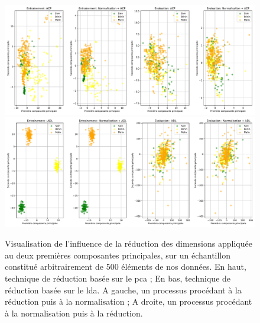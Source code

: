 \addtocounter{footnote}{1}
 
\begin{figure}[H]
    \centering
    \includegraphics[width=\linewidth]{contents/chapter_4/resources/visualisation_scaling_PCA.pdf}
    \includegraphics[width=\linewidth]{contents/chapter_4/resources/visualisation_scaling_LDA.pdf}
    \caption{Visualisation de l'influence de la réduction des dimensions appliquée au deux premières composantes principales, sur un échantillon constitué arbitrairement de 500 éléments de nos données. En haut, technique de réduction basée sur le \gls{pca} ; En bas, technique de réduction basée sur le \gls{lda}. A gauche, un processus procédant à la réduction puis à la normalisation ; A droite, un processus procédant à la normalisation puis à la réduction.}
    \label{fig:visualisation_scaling_reduction}
\end{figure}\par

    
